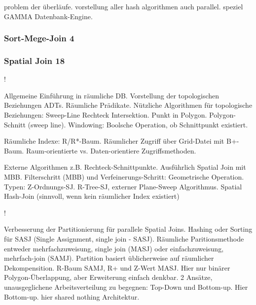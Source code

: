 \documentclass[a4paper,12pt,twoside]{article}
\begin{document}
\textbf{}


\textbf{}


\textbf{}


\textbf{}


\textbf{}


\textbf{}

\textbf{}

problem der überläufe. vorstellung aller hash algorithmen auch parallel. speziel GAMMA Datenbank-Engine.

\subsubsection{Sort-Mege-Join 4}
\textbf{}


\textbf{}


\textbf{}


\textbf{}

\textbf{}

\textbf{}

\subsubsection{Spatial Join 18}

\textbf{}!

Allgemeine Einführung in räumliche DB. Vorstellung der topologischen Beziehungen ADTs. Räumliche Prädikate. Nützliche Algorithmen für topologische Beziehungen: Sweep-Line Rechteck Intersektion. Punkt in Polygon. Polygon-Schnitt (sweep line). Windowing: Boolsche Operation, ob Schnittpunkt existiert.

Räumliche Indexe: R/R*-Baum. Räumlicher Zugriff über Grid-Datei mit B+-Baum. Raum-orientierte vs. Daten-orientiere Zugriffsmethoden. 

Externe Algorithmen z.B. Rechteck-Schnittpunkte. Ausführlich Spatial Join mit MBB. Filterschritt (MBB) und Verfeinerungs-Schritt:  Geometrische Operation. Typen: Z-Ordnungs-SJ. R-Tree-SJ, externer Plane-Sweep Algorithmus. Spatial Hash-Join (sinnvoll, wenn kein räumlicher Index existiert)

\textbf{}!

Verbesserung der Partitionierung für parallele Spatial Joins. Hashing oder Sorting für SASJ (Single Assignment, single join - SASJ). Räumliche Paritionsmethode entweder mehrfachzuweisung, single join (MASJ) oder einfachzuweisung, mehrfach-join (SAMJ). Partition basiert üblicherweise auf räumlicher Dekompensition. R-Baum SAMJ, R+ und Z-Wert MASJ. Hier nur binärer Polygon-Überlappung, aber Erweiterung einfach denkbar. 2 Ansätze, unausgeglichene Arbeitsverteilung zu begegnen: Top-Down und Bottom-up. Hier Bottom-up. hier shared nothing Architektur.
\end{document}
